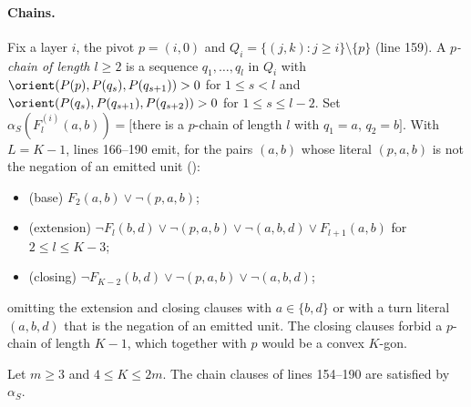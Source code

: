 \paragraph{Chains.} Fix a layer $i$, the pivot $p=(i,0)$ and $Q_i=\{(j,k):j\ge i\}\setminus\{p\}$ (line 159). A
\emph{$p$-chain of length $l\ge2$} is a sequence $q_1,\dots,q_l$ in $Q_i$ with $\orient(P(p),P(q_s),P(q_{s+1}))>0$ for
$1\le s<l$ and $\orient(P(q_s),P(q_{s+1}),P(q_{s+2}))>0$ for $1\le s\le l-2$. Set
$\alpha_S(F^{(i)}_l(a,b))=[$there is a $p$-chain of length $l$ with $q_1=a$, $q_2=b]$. With $L=K-1$, lines 166--190 emit,
for the pairs $(a,b)$ whose literal $(p,a,b)$ is not the negation of an emitted unit ():
\begin{itemize}
\item (base) $F_2(a,b)\vee\neg$$(p,a,b)$;
\item (extension) $\neg F_l(b,d)\vee\neg$$(p,a,b)\vee\neg$$(a,b,d)\vee F_{l+1}(a,b)$ for $2\le l\le K-3$;
\item (closing) $\neg F_{K-2}(b,d)\vee\neg$$(p,a,b)\vee\neg$$(a,b,d)$;
\end{itemize}
omitting the extension and closing clauses with $a\in\{b,d\}$ or with a turn literal $(a,b,d)$ that is the
negation of an emitted unit. The closing clauses forbid a $p$-chain of length $K-1$, which together with $p$ would be a
convex $K$-gon.

\begin{lemma}\label{k8s:lem:chain}
Let $m\ge3$ and $4\le K\le2m$. The chain clauses of lines 154--190 are satisfied by $\alpha_S$.
\end{lemma}

